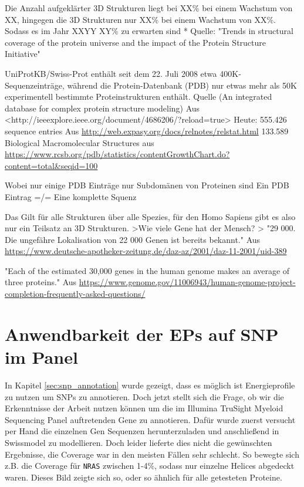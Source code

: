Die Anzahl aufgeklärter 3D Strukturen liegt bei XX\% bei einem Wachstum von XX, hingegen die 3D Strukturen nur XX\% bei einem Wachstum von XX\%. Sodass es im Jahr XXYY XY\% zu erwarten sind * Quelle: "Trends in structural coverage of the protein universe and the impact of the Protein Structure Initiative"


UniProtKB/Swiss-Prot enthält seit dem 22. Juli 2008 etwa 400K-Sequenzeinträge, während die Protein-Datenbank (PDB) nur etwas mehr als 50K experimentell bestimmte Proteinstrukturen enthält. 
Quelle (An integrated database for complex protein structure modeling) Aus <http://ieeexplore.ieee.org/document/4686206/?reload=true> 
Heute:  
555.426 sequence entries Aus \url{http://web.expasy.org/docs/relnotes/relstat.html} 
133.589 Biological Macromolecular Structures aus \url{https://www.rcsb.org/pdb/statistics/contentGrowthChart.do?content=total&seqid=100}

Wobei nur einige PDB Einträge nur Subdomänen von Proteinen sind
Ein PDB Eintrag =/= Eine komplette Squenz

Das Gilt für alle Strukturen über alle Spezies, für den Homo Sapiens gibt es also nur ein Teilsatz an 3D Strukturen.
    >Wie viele Gene hat der Mensch? >
    "29 000. Die ungefähre Lokalisation von 22 000 Genen ist bereits bekannt."
Aus \url{https://www.deutsche-apotheker-zeitung.de/daz-az/2001/daz-11-2001/uid-389}

"Each of the estimated 30,000 genes in the human genome makes an average of three proteins."
Aus \url{https://www.genome.gov/11006943/human-genome-project-completion-frequently-asked-questions/}




\section{Anwendbarkeit der EPs auf SNP im Panel}

In Kapitel \ref{sec:snp_annotation} wurde gezeigt, dass es möglich ist Energieprofile zu nutzen um \ac{SNPs} zu annotieren. Doch jetzt stellt sich die Frage, ob wir die Erkenntnisse der Arbeit nutzen können um die im Illumina TruSight Myeloid Sequencing Panel auftretenden Gene zu annotieren. Dafür wurde zuerst versucht per Hand die einzelnen Gen Sequenzen herunterzuladen und anschließend in Swissmodel zu modellieren. Doch leider lieferte dies nicht die gewünschten Ergebnisse, die Coverage war in den meisten Fällen sehr schlecht. So bewegte sich z.B. die Coverage für \texttt{NRAS} zwischen 1-4\%, sodass nur einzelne Helices abgedeckt waren. Dieses Bild zeigte sich so, oder so ähnlich für alle getesteten Proteine. 

